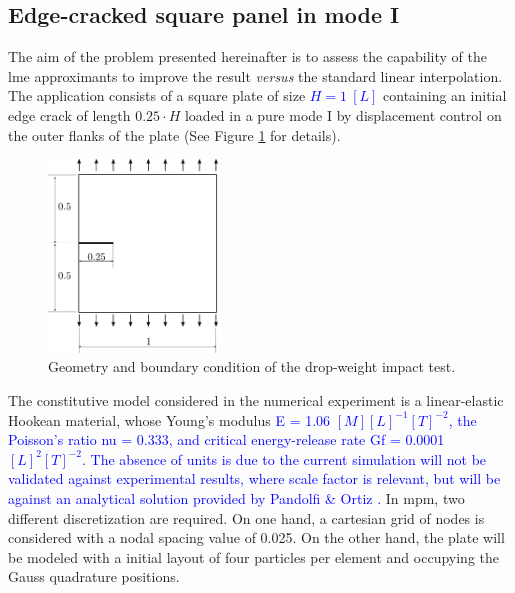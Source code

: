 \message{ !name(2020_EFM_MPM_Eigensoftening.tex)}\documentclass[preprint,12pt,a4paper]{elsarticle}
\newcommand{\MMP}[1]{
  \textcolor{blue}{{#1}}
}
\begin{document}
\subsection{Edge-cracked square panel in mode I}
\label{sec:3.1}
The aim of the problem presented hereinafter is to assess the
capability of the \acrshort{lme} approximants to improve the result
\textit{versus} the standard linear interpolation. The application
consists of a square plate of size\MMP{$H = 1\ [L] $} containing an initial edge
crack of length $0.25 \cdot H$ loaded in a pure mode I by displacement
control on the outer flanks of the plate (See Figure
\ref{fig:geometry-cracked-panel-mode-I} for details). 
\begin{figure}
  \centering
  \includegraphics[width=0.4\textwidth]{Figure-Mode_I}
  \caption{Geometry and boundary condition of the drop-weight impact test.}
  \label{fig:geometry-cracked-panel-mode-I}
\end{figure}
The constitutive model considered in the numerical experiment is a
linear-elastic Hookean material, whose Young's modulus \MMP{\gls{E} = 1.06
$[M] [L]^{-1} [T]^{-2}$, the Poisson's ratio \gls{nu} = 0.333, and
critical energy-release rate \gls{Gf} = 0.0001 $[L]^{2} [T]^{-2}$. The absence of units is due to the current simulation will not be validated against experimental results, where
scale factor is relevant, but will be against an analytical
solution provided by Pandolfi \& Ortiz \cite{Pandolfi_2012}.} In
\acrshort{mpm}, two different discretization are required. On one
hand, a cartesian grid of nodes is considered with a nodal spacing
value of 0.025. On the other hand, the plate will be modeled with a
initial layout of four particles per element and occupying the Gauss
quadrature positions.\\
\end{document}
